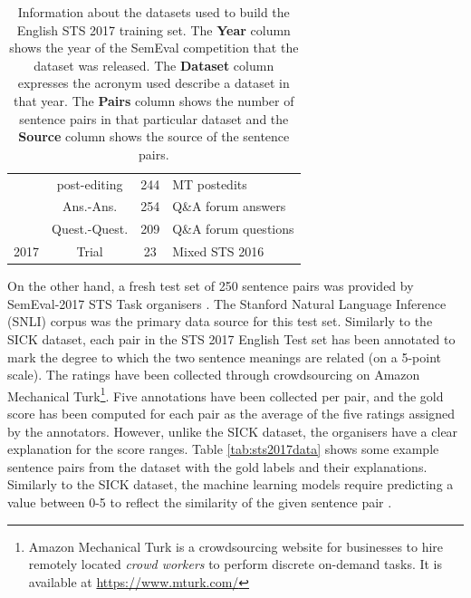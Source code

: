 \begin{enumerate}
\begin{table}[ht!]
\begin{tabular}{c|c|c|l}
 		& post-editing & 244 & MT postedits \\
 		 & Ans.-Ans. & 254 & Q\&A forum answers \\
 		 & Quest.-Quest. & 209 & Q\&A forum questions \\
 		\hline
 		\makecell{2017 \\ \autocite{cer-etal-2017-semeval}} & Trial & 23 & Mixed STS 2016 \\
 		\hline
 	\end{tabular}
 	\caption[Information about English STS 2017 training set]{Information about the datasets used to build the English STS 2017 training set. The \textbf{Year} column shows the year of the SemEval competition that the dataset was released. The \textbf{Dataset} column expresses the acronym used describe a dataset in that year. The \textbf{Pairs} column shows the number of sentence pairs in that particular dataset and the \textbf{Source} column shows the source of the sentence pairs. }
 	\label{tab:englishdata_info}
 \end{table}

On the other hand, a fresh test set of 250 sentence pairs was provided by SemEval-2017 STS Task organisers \autocite{cer-etal-2017-semeval}. The Stanford Natural Language Inference (SNLI) corpus \autocite{bowman-etal-2015-large} was the primary data source for this test set. Similarly to the SICK dataset, each pair in the STS 2017 English Test set has been annotated to mark the degree to which the two sentence meanings are related (on a 5-point scale). The ratings have been collected through crowdsourcing on Amazon Mechanical Turk\footnote{Amazon Mechanical Turk is a crowdsourcing website for businesses to hire remotely located \textit{crowd workers} to perform discrete on-demand tasks. It is available at \url{https://www.mturk.com/}}. Five annotations have been collected per pair, and the gold score has been computed for each pair as the average of the five ratings assigned by the annotators. However, unlike the SICK dataset, the organisers have a clear explanation for the score ranges. Table \ref{tab:sts2017data} shows some example sentence pairs from the dataset with the gold labels and their explanations. Similarly to the SICK dataset, the machine learning models require predicting a value between 0-5 to reflect the similarity of the given sentence pair \autocite{cer-etal-2017-semeval}.


\end{enumerate}
